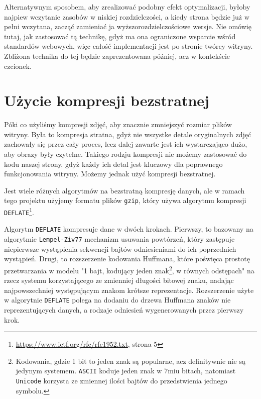 \documentclass[licencjacka]{pracadypl}
\begin{document}
Alternatywnym sposobem, aby zrealizować podobny efekt optymalizacji, byłoby najpiew wczytanie zasobów w niskiej rozdzielczości, a kiedy strona będzie już w pełni wczytana, zacząć zamieniać ja wyższorozdzielczościowe wersje. Nie omówię tutaj, jak zastosować tą technikę, gdyż ma ona ograniczone wsparcie wśród standardów webowych, więc całość implementacji jest po stronie twórcy witryny. Zbliżona technika do tej będzie zaprezentowana później, acz w kontekście czcionek.


\section{Użycie kompresji bezstratnej}

Póki co użyliśmy kompresji zdjęć, aby znacznie zmniejszyć rozmiar plików witryny. Była to kompresja stratna, gdyż nie wszystke detale oryginalnych zdjęć zachowały się przez cały proces, lecz dalej zawarte jest ich wystarczająco dużo, aby obrazy były czytelne. Takiego rodzju kompresji nie możemy zastosować do kodu naszej strony, gdyż każdy ich detal jest kluczowy dla poprawnego funkcjonowania witryny. Możemy jednak użyć kompresji bezstratnej.

Jest wiele różnych algorytmów na bezstratną kompresję danych, ale w ramach tego projektu użyjemy formatu plików \texttt{gzip}, który używa  algorytmu kompresji \texttt{DEFLATE}\footnote{\url{https://www.ietf.org/rfc/rfc1952.txt}, strona 5}.

Algorytm \texttt{DEFLATE} kompresuje dane w dwóch krokach. Pierwszy, to bazowany na algorytmie \texttt{Lempel-Ziv77} mechanizm usuwania powtórzeń, który zastępuje niepierwsze wystąpienia sekwencji bajtów odniesieniami do ich poprzednich wystąpień. Drugi, to rozszerzenie kodowania Huffmana, które poświęca prostotę przetwarzania w modelu "1 bajt, kodujący jeden znak\footnote{Kodowania, gdzie 1 bit to jeden znak są popularne, acz definitywnie nie są jedynym systemem. \texttt{ASCII} koduje jeden znak w $7$miu bitach, natomiast \texttt{Unicode} korzysta ze zmiennej ilości bajtów do przedstwienia jednego symbolu.}, w równych odstępach" na rzecz systemu korzystającego ze zmienniej długości bitowej znaku, nadając najpowszechniej występującym znakom krótsze reprezentacje. Rozszerzenie użyte w algorytnie \texttt{DEFLATE} polega na dodaniu do drzewa Huffmana znaków nie reprezentujących danych, a rodzaje odniesień wygenerowanych przez pierwszy krok.
\end{document}
